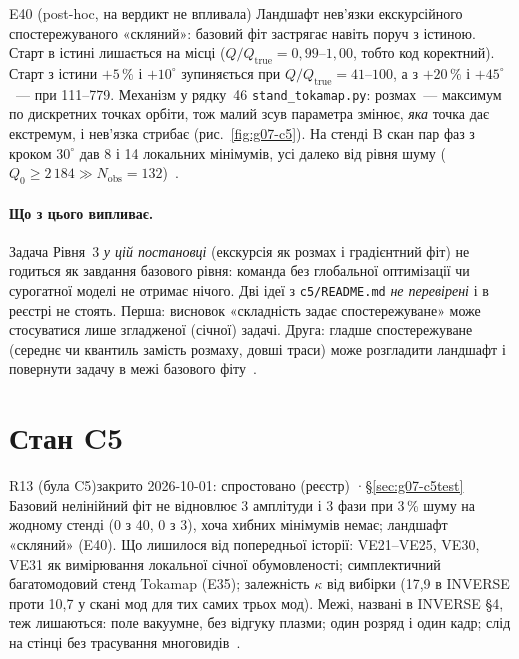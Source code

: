 \begin{established}{E40 (post-hoc, на вердикт не впливала)}
Ландшафт нев'язки екскурсійного спостережуваного «скляний»: базовий фіт застрягає навіть поруч з істиною. Старт в істині лишається на місці ($Q/Q_{\mathrm{true}}=0{,}99$--$1{,}00$, тобто код коректний). Старт з істини $+5\,\%$ і $+10^\circ$ зупиняється при $Q/Q_{\mathrm{true}}=41$--$100$, а з $+20\,\%$ і $+45^\circ$~--- при 111--779. Механізм у рядку~46 \texttt{stand\_tokamap.py}: розмах~--- максимум по дискретних точках орбіти, тож малий зсув параметра змінює, \emph{яка} точка дає екстремум, і нев'язка стрибає (рис.~\ref{fig:g07-c5}). На стенді B скан пар фаз з кроком $30^\circ$ дав 8 і 14 локальних мінімумів, усі далеко від рівня шуму ($Q_0\ge2\,184\gg N_{\mathrm{obs}}=132$)~\cite{RegEst,g07C5}.
\end{established}

\paragraph{Що з цього випливає.} Задача Рівня~3 \emph{у цій постановці} (екскурсія як розмах і градієнтний фіт) не годиться як завдання базового рівня: команда без глобальної оптимізації чи сурогатної моделі не отримає нічого. Дві ідеї з \texttt{c5/README.md} \emph{не перевірені} і в реєстрі не стоять. Перша: висновок «складність задає спостережуване» може стосуватися лише згладженої (січної) задачі. Друга: гладше спостережуване (середнє чи квантиль замість розмаху, довші траси) може розгладити ландшафт і повернути задачу в межі базового фіту~\cite{g07C5}.

\section{Стан C5}\label{sec:g07-status}

\begin{itemcard}{R13 (була C5)}{закрито 2026-10-01: спростовано (реєстр) \quad·\quad \S\ref{sec:g07-c5test}}
Базовий нелінійний фіт не відновлює 3 амплітуди і 3 фази при 3\,\% шуму на жодному стенді (0 з 40, 0 з 3), хоча хибних мінімумів немає; ландшафт «скляний» (E40). Що лишилося від попередньої історії: VE21--VE25, VE30, VE31 як вимірювання локальної січної обумовленості; симплектичний багатомодовий стенд Tokamap (E35); залежність $\kappa$ від вибірки (17,9 в INVERSE проти 10,7 у скані мод для тих самих трьох мод). Межі, названі в INVERSE §4, теж лишаються: поле вакуумне, без відгуку плазми; один розряд і один кадр; слід на стінці без трасування многовидів~\cite{RegEst,RegConj,g07Inverse}.
\end{itemcard}

